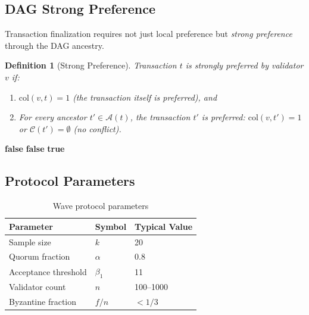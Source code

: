 \documentclass[11pt,a4paper]{article}
\newtheorem{definition}{Definition}[section]
\begin{document}
\subsection{DAG Strong Preference}

Transaction finalization requires not just local preference but \emph{strong preference}
through the DAG ancestry.

\begin{definition}[Strong Preference]
\label{def:strong-pref}
Transaction $t$ is \emph{strongly preferred} by validator $v$ if:
\begin{enumerate}[nosep]
\item $\text{col}(v, t) = 1$ (the transaction itself is preferred), and
\item For every ancestor $t' \in \mathcal{A}(t)$, the transaction $t'$ is preferred:
$\text{col}(v, t') = 1$ or $\mathcal{C}(t') = \emptyset$ (no conflict).
\end{enumerate}
\end{definition}

\begin{algorithm}[H]
\caption{Wave DAG Strong Preference Check}
\label{alg:wave-dag}
\begin{algorithmic}[1]
        \Return \textbf{false}
    \EndIf
     
            \Return \textbf{false} 
        \EndIf
    \EndFor
    \Return \textbf{true}
\EndFunction
\end{algorithmic}
\end{algorithm}

\subsection{Protocol Parameters}

\begin{table}[h]
\centering
\begin{tabular}{@{}lll@{}}
\toprule
\textbf{Parameter} & \textbf{Symbol} & \textbf{Typical Value} \\
\midrule
Sample size & $k$ & 20 \\
Quorum fraction & $\alpha$ & 0.8 \\
Acceptance threshold & $\beta_1$ & 11 \\
Validator count & $n$ & 100--1000 \\
Byzantine fraction & $f/n$ & $< 1/3$ \\
\bottomrule
\end{tabular}
\caption{Wave protocol parameters}
\label{tab:params}
\end{table}
\end{document}

